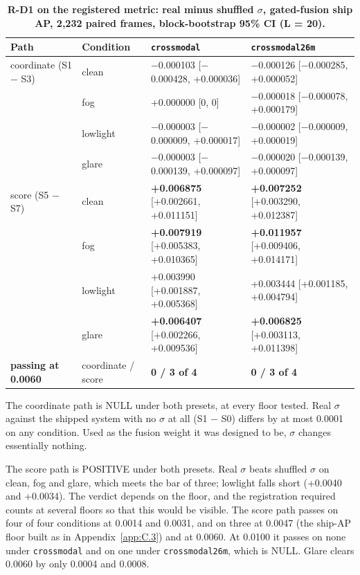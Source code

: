 \documentclass[10pt]{article}
\begin{document}
\begin{table}[htbp]
\centering
\footnotesize
\caption{\textbf{R-D1 on the registered metric: real minus shuffled $\sigma$, gated-fusion ship AP, 2,232 paired frames, block-bootstrap 95\% CI (L = 20).}}
\label{tab:10}
\begin{tabularx}{\linewidth}{ll>{\raggedright\arraybackslash}X>{\raggedright\arraybackslash}X}
\toprule
Path & Condition & \texttt{crossmodal} & \texttt{crossmodal26m} \\
\midrule
coordinate (S1 $-$ S3) & clean & $-$0.000103 [$-$0.000428, +0.000036] & $-$0.000126 [$-$0.000285, +0.000052] \\
 & fog & +0.000000 [0, 0] & $-$0.000018 [$-$0.000078, +0.000179] \\
 & lowlight & $-$0.000003 [$-$0.000009, +0.000017] & $-$0.000002 [$-$0.000009, +0.000019] \\
 & glare & $-$0.000003 [$-$0.000139, +0.000097] & $-$0.000020 [$-$0.000139, +0.000097] \\
score (S5 $-$ S7) & clean & \textbf{+0.006875} [+0.002661, +0.011151] & \textbf{+0.007252} [+0.003290, +0.012387] \\
 & fog & \textbf{+0.007919} [+0.005383, +0.010365] & \textbf{+0.011957} [+0.009406, +0.014171] \\
 & lowlight & +0.003990 [+0.001887, +0.005368] & +0.003444 [+0.001185, +0.004794] \\
 & glare & \textbf{+0.006407} [+0.002266, +0.009536] & \textbf{+0.006825} [+0.003113, +0.011398] \\
\textbf{passing at 0.0060} & coordinate / score & \textbf{0 / 3 of 4} & \textbf{0 / 3 of 4} \\
\bottomrule
\end{tabularx}
\end{table}
The coordinate path is NULL under both presets, at every floor tested. Real $\sigma$ against the shipped system with no $\sigma$ at all (S1 $-$ S0) differs by at most 0.0001 on any condition. Used as the fusion weight it was designed to be, $\sigma$ changes essentially nothing.

The score path is POSITIVE under both presets. Real $\sigma$ beats shuffled $\sigma$ on clean, fog and glare, which meets the bar of three; lowlight falls short (+0.0040 and +0.0034). The verdict depends on the floor, and the registration required counts at several floors so that this would be visible. The score path passes on four of four conditions at 0.0014 and 0.0031, and on three at 0.0047 (the ship-AP floor built as in Appendix~\ref{app:C.3}) and at 0.0060. At 0.0100 it passes on none under \texttt{crossmodal} and on one under \texttt{crossmodal26m}, which is NULL. Glare clears 0.0060 by only 0.0004 and 0.0008.
\end{document}
